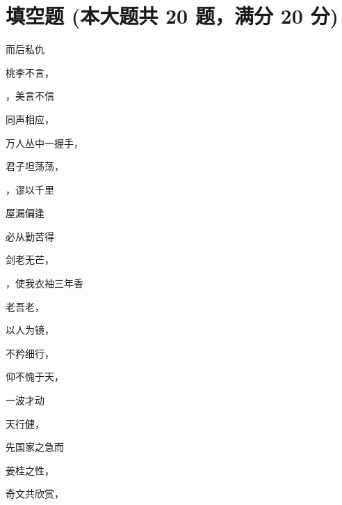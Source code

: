 \documentclass[12pt, a4paper, addpoints]{exam}
\begin{document}
\section{\normalsize{填空题 (本大题共 20 题，满分 20 分)}}
\hspace{1.5cm}
\begin{multicols}{2}
\begin{questions}
\question[1] \uline{\qquad\qquad\qquad}而后私仇

\question[1] 桃李不言，\uline{\qquad\qquad\qquad}

\question[1] \uline{\qquad\qquad\qquad}，美言不信

\question[1] 同声相应，\uline{\qquad\qquad\qquad}

\question[1] 万人丛中一握手，\uline{\qquad\qquad\qquad}

\question[1] 君子坦荡荡，\uline{\qquad\qquad\qquad}

\question[1] \uline{\qquad\qquad\qquad}，谬以千里

\question[1] 屋漏偏逢\uline{\qquad\qquad\qquad}

\question[1] \uline{\qquad\qquad\qquad}必从勤苦得

\question[1] 剑老无芒，\uline{\qquad\qquad\qquad}

\question[1] \uline{\qquad\qquad\qquad}，使我衣袖三年香

\question[1] 老吾老，\uline{\qquad\qquad\qquad}

\question[1] 以人为镜，\uline{\qquad\qquad\qquad}

\question[1] 不矜细行，\uline{\qquad\qquad\qquad}

\question[1] 仰不愧于天，\uline{\qquad\qquad\qquad}

\question[1] 一波才动\uline{\qquad\qquad\qquad}

\question[1] 天行健，\uline{\qquad\qquad\qquad}

\question[1] 先国家之急而\uline{\qquad\qquad\qquad}

\question[1] 姜桂之性，\uline{\qquad\qquad\qquad}

\question[1] 奇文共欣赏，\uline{\qquad\qquad\qquad}

\end{questions}
\end{multicols}
\end{document}
